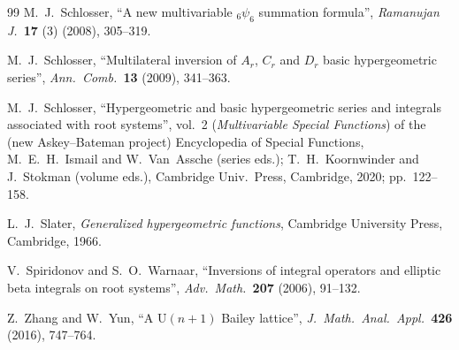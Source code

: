 \documentclass[reqno,12pt]{amsart}
\theoremstyle{remark}
\numberwithin{equation}{section}
\begin{document}
\begin{thebibliography}{99}
M.\ J.\ Schlosser,
``A new multivariable ${}_6\psi_6$ summation formula'',
\textit{Ramanujan J.\ }\textbf{17} (3) (2008), 305--319.

 M.~J.~Schlosser,
``Multilateral inversion of $A_r$, $C_r$ and $D_r$ basic
hypergeometric series'',
{\em Ann.\ Comb.\ }\textbf{13} (2009), 341--363.

 M.~J.~Schlosser,
``Hypergeometric and basic hypergeometric series and integrals
associated with root systems'',
vol.\ 2 ({\em Multivariable Special Functions}) of the
(new Askey--Bateman project) Encyclopedia of Special Functions,
M.~E.~H.~Ismail and W.~Van~Assche (series eds.);
T.~H.~Koornwinder and J.~Stokman (volume eds.),
Cambridge Univ.\ Press, Cambridge, 2020; pp.\ 122--158.

 L.~J.~Slater,
{\em Generalized hypergeometric functions}, 
Cambridge University Press, Cambridge, 1966.

 V.\ Spiridonov and S.\ O.\ Warnaar,
``Inversions of integral operators and elliptic beta integrals
  on root systems'',
{\em Adv.\ Math.\ }\textbf{207} (2006), 91--132.

Z.\ Zhang and W.\ Yun,
``A $\mathrm U(n+1)$ {B}ailey lattice'',
\textit{J.\ Math.\ Anal.\ Appl.\ }\textbf{426} (2016), 747--764.

\end{thebibliography}
\end{document}
